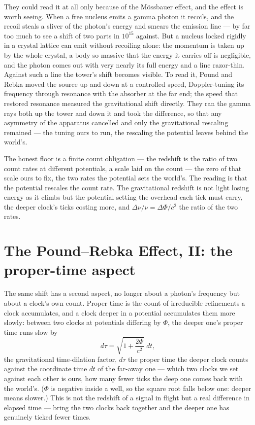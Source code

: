 They could read it at all only because of the M\"ossbauer effect, and the effect is worth seeing. When a free
nucleus emits a gamma photon it recoils, and the recoil steals a sliver of the photon's energy and smears the
emission line --- by far too much to see a shift of two parts in $10^{15}$ against. But a nucleus locked rigidly
in a crystal lattice can emit without recoiling alone: the momentum is taken up by the whole crystal, a body so
massive that the energy it carries off is negligible, and the photon comes out with very nearly its full energy
and a line razor-thin. Against such a line the tower's shift becomes visible. To read it, Pound and Rebka moved
the source up and down at a controlled speed, Doppler-tuning its frequency through resonance with the absorber
at the far end; the speed that restored resonance measured the gravitational shift directly. They ran the gamma
rays both up the tower and down it and took the difference, so that any asymmetry of the apparatus cancelled and
only the gravitational rescaling remained --- the tuning ours to run, the rescaling the potential leaves behind
the world's.

The honest floor is a finite count obligation --- the redshift is the ratio of two count rates at different
potentials, a scale laid on the count --- the zero of that scale ours to fix, the two rates the potential sets
the world's. The reading is that the potential rescales the count rate. The
gravitational redshift is not light losing energy as it climbs but the potential setting the overhead each tick
must carry, the deeper clock's ticks costing more, and $\Delta\nu/\nu = \Delta\Phi/c^2$ the ratio of the two
rates.

\section{The Pound--Rebka Effect, II: the proper-time aspect}
\label{se:pound-rebka-proper-time}

The same shift has a second aspect, no longer about a photon's frequency but about a clock's own count. Proper
time is the count of irreducible refinements a clock accumulates, and a clock deeper in a potential accumulates
them more slowly: between two clocks at potentials differing by $\Phi$, the deeper one's proper time runs slow
by
\begin{equation}
  d\tau = \sqrt{1 + \frac{2\Phi}{c^2}}\;dt,
\end{equation}
the gravitational time-dilation factor, $d\tau$ the proper time the deeper clock counts against the coordinate
time $dt$ of the far-away one --- which two clocks we set against each other is ours, how many fewer ticks the
deep one comes back with the world's. ($\Phi$ is negative inside a well, so the square root falls below one: deeper
means slower.) This is not the redshift of a signal in flight but a real difference in elapsed time --- bring
the two clocks back together and the deeper one has genuinely ticked fewer times.

